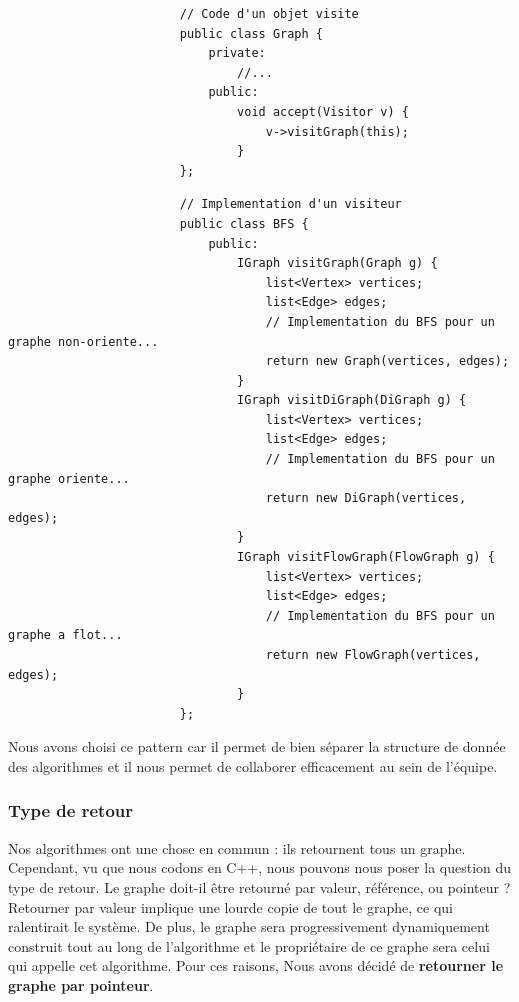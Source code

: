 \documentclass[french]{article}
\begin{document}
			\begin{lstlisting}
						// Code d'un objet visite
						public class Graph {
							private:
								//...
							public:
								void accept(Visitor v) {
									v->visitGraph(this);
								}
						};
			\end{lstlisting}
			\begin{lstlisting}
						// Implementation d'un visiteur
						public class BFS {
							public:
								IGraph visitGraph(Graph g) {
									list<Vertex> vertices;
									list<Edge> edges;
									// Implementation du BFS pour un graphe non-oriente...
									return new Graph(vertices, edges);
								}
								IGraph visitDiGraph(DiGraph g) {
									list<Vertex> vertices;
									list<Edge> edges;
									// Implementation du BFS pour un graphe oriente...
									return new DiGraph(vertices, edges);
								}
								IGraph visitFlowGraph(FlowGraph g) {
									list<Vertex> vertices;
									list<Edge> edges;
									// Implementation du BFS pour un graphe a flot...
									return new FlowGraph(vertices, edges);
								}
						};
			\end{lstlisting}
			
			Nous avons choisi ce pattern car il permet de bien séparer la structure de donnée des algorithmes et il nous permet de collaborer efficacement au sein de l'équipe.
			
			\subsubsection{Type de retour}
			Nos algorithmes ont une chose en commun : ils retournent tous un graphe. Cependant, vu que nous codons en C++, nous pouvons nous poser la question du type de retour. Le graphe doit-il être retourné par valeur, référence, ou pointeur ?\\
			Retourner par valeur implique une lourde copie de tout le graphe, ce qui ralentirait le système. De plus, le graphe sera progressivement dynamiquement construit tout au long de l'algorithme et le propriétaire de ce graphe sera celui qui appelle cet algorithme. Pour ces raisons, Nous avons décidé de \textbf{retourner le graphe par pointeur}.
			
\end{document}
